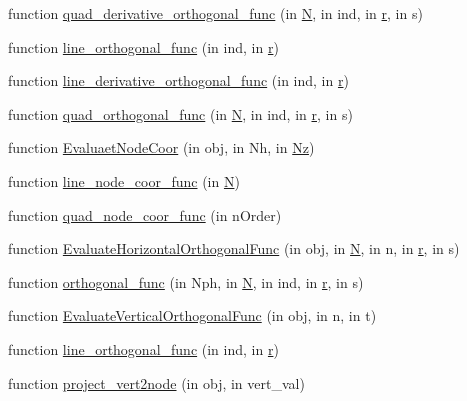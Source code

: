 \begin{DoxyCompactItemize}
\item 
function \hyperlink{class_std_prism_quad_a58a6316f5c6b6017203498b7825eef4c}{quad\+\_\+derivative\+\_\+orthogonal\+\_\+func} (in \hyperlink{class_std_prism_quad_a102875849698a7af9c9599f48b48104d}{N}, in ind, in \hyperlink{class_std_prism_quad_ab1bbbef07ec9f1a9f0727140c5c26f39}{r}, in s)
\item 
function \hyperlink{class_std_prism_quad_a4b3b6bd52de86cae8f74eb7200cdc0d2}{line\+\_\+orthogonal\+\_\+func} (in ind, in \hyperlink{class_std_prism_quad_ab1bbbef07ec9f1a9f0727140c5c26f39}{r})
\item 
function \hyperlink{class_std_prism_quad_a1f7518879a176a634c103becc8945a9e}{line\+\_\+derivative\+\_\+orthogonal\+\_\+func} (in ind, in \hyperlink{class_std_prism_quad_ab1bbbef07ec9f1a9f0727140c5c26f39}{r})
\item 
function \hyperlink{class_std_prism_quad_ae7b4f983d94b71de01fb059d7dbcf49d}{quad\+\_\+orthogonal\+\_\+func} (in \hyperlink{class_std_prism_quad_a102875849698a7af9c9599f48b48104d}{N}, in ind, in \hyperlink{class_std_prism_quad_ab1bbbef07ec9f1a9f0727140c5c26f39}{r}, in s)
\item 
function \hyperlink{class_std_prism_quad_a5a717dd144ff2145037ba94c2fc36870}{Evaluaet\+Node\+Coor} (in obj, in Nh, in \hyperlink{class_std_prism_quad_a62d7fa646d7c8cb0cfbebbb0b3cde473}{Nz})
\item 
function \hyperlink{class_std_prism_quad_afcd6e3f615437bf5ead1edc5b963fc1a}{line\+\_\+node\+\_\+coor\+\_\+func} (in \hyperlink{class_std_prism_quad_a102875849698a7af9c9599f48b48104d}{N})
\item 
function \hyperlink{class_std_prism_quad_a0bafc4c58abe275d555f5a19e9acb190}{quad\+\_\+node\+\_\+coor\+\_\+func} (in n\+Order)
\item 
function \hyperlink{class_std_prism_quad_ace1e94b27761d4d93f6fb26411142ca8}{Evaluate\+Horizontal\+Orthogonal\+Func} (in obj, in \hyperlink{class_std_prism_quad_a102875849698a7af9c9599f48b48104d}{N}, in n, in \hyperlink{class_std_prism_quad_ab1bbbef07ec9f1a9f0727140c5c26f39}{r}, in s)
\item 
function \hyperlink{class_std_prism_quad_aec55fc052d6e826ada2bddfe43926c87}{orthogonal\+\_\+func} (in Nph, in \hyperlink{class_std_prism_quad_a102875849698a7af9c9599f48b48104d}{N}, in ind, in \hyperlink{class_std_prism_quad_ab1bbbef07ec9f1a9f0727140c5c26f39}{r}, in s)
\item 
function \hyperlink{class_std_prism_quad_a42478cc16a5c5c06f2ee39e547b369de}{Evaluate\+Vertical\+Orthogonal\+Func} (in obj, in n, in t)
\item 
function \hyperlink{class_std_prism_quad_a4b3b6bd52de86cae8f74eb7200cdc0d2}{line\+\_\+orthogonal\+\_\+func} (in ind, in \hyperlink{class_std_prism_quad_ab1bbbef07ec9f1a9f0727140c5c26f39}{r})
\item 
function \hyperlink{class_std_prism_quad_a5dd79c27725720357500b0d43f925635}{project\+\_\+vert2node} (in obj, in vert\+\_\+val)
\end{DoxyCompactItemize}
